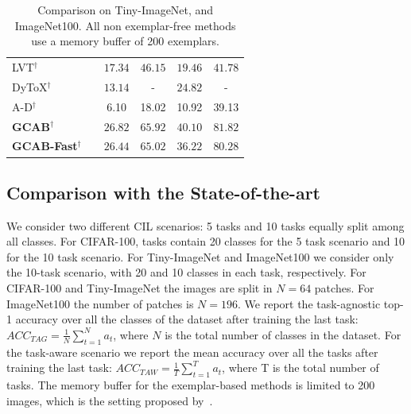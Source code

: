 \documentclass[twocolumn]{svjour3}          %
\newcommand{\cmark}{\ding{51}}%
\newcommand{\xmark}{\ding{55}}%
\begin{document}
\begin{table}[tb]
\begin{tabular}{lccccc}
    \hline
    LVT$^{\dag}$ \hfill \citep{wang2022continual} &\xmark 
    &$17.34$ &$46.15$& $19.46$ & $41.78$ 
     \\
    DyToX$^{\dag}$ \hfill \citep{douillard2022dytox} &\xmark 
    &$13.14$ & - & $24.82$ & - 
     \\
    A-D$^{\dag}$ \hfill \citep{pelosin2022towards}
    & \cmark & \phantom{0}6.10 & 18.02 & 10.92 & 39.13 \\
    \hline
    \textbf{GCAB}$^{\dag}$ & \cmark
    & $\mathbf{26.82}$ & $\mathbf{65.92}$& $\mathbf{40.10}$ & $\mathbf{81.82}$
    \\
    \textbf{GCAB-Fast}$^{\dag}$ & \cmark
    & ${26.44 }$ & ${65.02 }$&$36.22$ &$80.28$ 
    \\
    \hline
  \end{tabular}
\caption{Comparison on Tiny-ImageNet, and ImageNet100. All non exemplar-free methods use a memory buffer of 200 exemplars.
}
\label{tab:200_tinyimagenet}
\end{table}





\subsection{Comparison with the State-of-the-art}
We consider two different CIL scenarios: 5 tasks and 10 tasks equally split among all classes. For CIFAR-100, tasks contain 20 classes for the 5 task scenario and 10 for the 10 task scenario. For Tiny-ImageNet and ImageNet100 we consider only the 10-task scenario, with 20 and 10 classes in each task, respectively. For CIFAR-100 and Tiny-ImageNet the images are split in $N=64$ patches. For ImageNet100 the number of patches is $N=196$. We report the task-agnostic top-1 accuracy over all the classes of the dataset after training the last task: $ACC_{TAG} = \frac{1}{N}\sum^{N}_{t=1}a_t$, where $N$ is the total number of classes in the dataset. For the task-aware scenario we report the mean accuracy over all the tasks after training the last task: $ACC_{TAW} = \frac{1}{T}\sum^{T}_{t=1}a_t$, where T is the total number of tasks.
The memory buffer for the exemplar-based methods is limited to 200 images, which is the setting proposed by~\cite{wang2022continual}.
\end{document}
